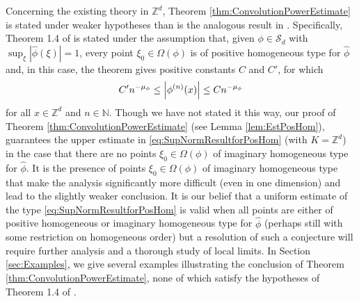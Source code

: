\documentclass[11pt, letter]{book}
\begin{document}
\noindent Concerning the existing theory in $\mathbb{Z}^d$, Theorem \ref{thm:ConvolutionPowerEstimate} is stated under weaker hypotheses than is the analogous result in \cite{randles_convolution_2017}. Specifically, Theorem 1.4 of \cite{randles_convolution_2017} is stated under the assumption that, given $\phi\in\mathcal{S}_d$ with $\sup_{\xi}|\widehat{\phi}(\xi)|=1$, every point $\xi_0\in\Omega(\phi)$ is of positive homogeneous type for $\widehat{\phi}$ and, in this case, the theorem gives positive constants $C$ and $C'$, for which
\begin{equation}\label{eq:SupNormResultforPosHom}
    C'n^{-\mu_\phi}\leq \abs{\phi^{(n)}(x)}\leq C n^{-\mu_\phi}
\end{equation}
for all $x\in\mathbb{Z}^d$ and $n\in\mathbb{N}$. Though we have not stated it this way, our proof of Theorem \ref{thm:ConvolutionPowerEstimate} (see Lemma \ref{lem:EstPosHom}), guarantees the upper estimate in \eqref{eq:SupNormResultforPosHom} (with $K=\mathbb{Z}^d$) in the case that there are no points $\xi_0\in\Omega(\phi)$ of imaginary homogeneous type for $\widehat{\phi}$. It is the presence of points $\xi_0\in\Omega(\phi)$ of imaginary homogeneous type that make the analysis significantly more difficult (even in one dimension) and lead to the slightly weaker conclusion. It is our belief that a uniform estimate of the type \eqref{eq:SupNormResultforPosHom} is valid when all points are either of positive homogeneous or imaginary homogeneous type for $\widehat\phi$ (perhaps still with some restriction on homogeneous order) but a resolution of such a conjecture will require further analysis and a thorough study of local limits. In Section \ref{sec:Examples}, we give several examples illustrating the conclusion of Theorem \ref{thm:ConvolutionPowerEstimate}, none of which satisfy the hypotheses of Theorem 1.4 of \cite{randles_convolution_2017}.\\
\end{document}
